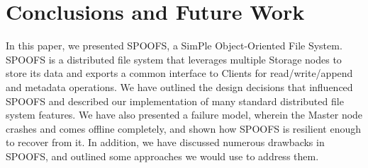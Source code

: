 \section{Conclusions and Future Work}
\label{sec:conclusions}

In this paper, we presented SPOOFS, a SimPle Object-Oriented File System.  SPOOFS is a distributed file system that leverages multiple Storage nodes to store its data and exports a common interface to Clients for read/write/append and metadata operations.  We have outlined the design decisions that influenced SPOOFS and described our implementation of many standard distributed file system features.  We have also presented a failure model, wherein the Master node crashes and comes offline completely, and shown how SPOOFS is resilient enough to recover from it.  In addition, we have discussed numerous drawbacks in SPOOFS, and outlined some approaches we would use to address them.

